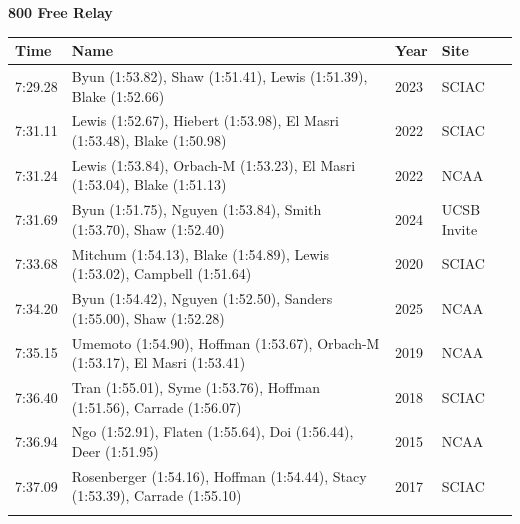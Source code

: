 \noindent\begin{minipage}[t]{0.98\textwidth}
\centering
\textbf{\textcolor{teamprimary}{800 Free Relay}}\par
\vspace{0.5em}
\centering
\small
\renewcommand{\arraystretch}{1.0}
\setlength{\tabcolsep}{4pt}
\begin{tabular}{@{}p{2.7cm}p{4.3cm}p{1.6cm}p{2.7cm}@{}}
\toprule
\textbf{Time} & \textbf{Name} & \textbf{Year} & \textbf{Site} \\
\midrule
7:29.28 & Byun (1:53.82), Shaw (1:51.41), Lewis (1:51.39), Blake (1:52.66) & 2023 & SCIAC \\
7:31.11 & Lewis (1:52.67), Hiebert (1:53.98), El Masri (1:53.48), Blake (1:50.98) & 2022 & SCIAC \\
7:31.24 & Lewis (1:53.84), Orbach-M (1:53.23), El Masri (1:53.04), Blake (1:51.13) & 2022 & NCAA \\
7:31.69 & Byun (1:51.75), Nguyen (1:53.84), Smith (1:53.70), Shaw (1:52.40) & 2024 & UCSB Invite \\
7:33.68 & Mitchum (1:54.13), Blake (1:54.89), Lewis (1:53.02), Campbell (1:51.64) & 2020 & SCIAC \\
7:34.20 & Byun (1:54.42), Nguyen (1:52.50), Sanders (1:55.00), Shaw (1:52.28) & 2025 & NCAA \\
7:35.15 & Umemoto (1:54.90), Hoffman (1:53.67), Orbach-M (1:53.17), El Masri (1:53.41) & 2019 & NCAA \\
7:36.40 & Tran (1:55.01), Syme (1:53.76), Hoffman (1:51.56), Carrade (1:56.07) & 2018 & SCIAC \\
7:36.94 & Ngo (1:52.91), Flaten (1:55.64), Doi (1:56.44), Deer (1:51.95) & 2015 & NCAA \\
7:37.09 & Rosenberger (1:54.16), Hoffman (1:54.44), Stacy (1:53.39), Carrade (1:55.10) & 2017 & SCIAC \\
\bottomrule
\vspace{0.5em}
\end{tabular}
\end{minipage}
\vspace{1.2em}
